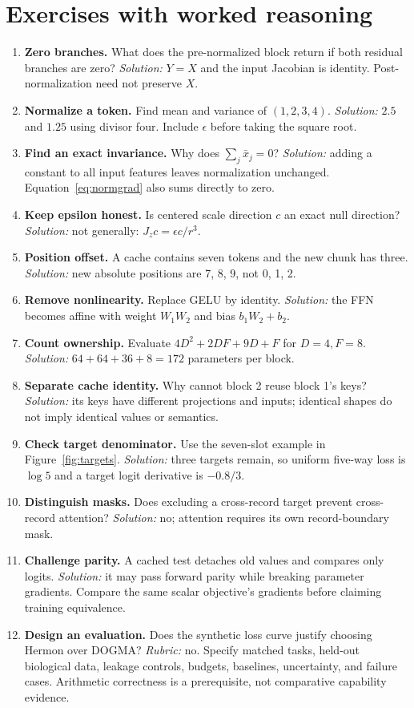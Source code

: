 \section{Exercises with worked reasoning}
\begin{enumerate}
\item \textbf{Zero branches.} What does the pre-normalized block return if both residual branches are zero? \emph{Solution:} $Y=X$ and the input Jacobian is identity. Post-normalization need not preserve $X$.
\item \textbf{Normalize a token.} Find mean and variance of $(1,2,3,4)$. \emph{Solution:} $2.5$ and $1.25$ using divisor four. Include $\epsilon$ before taking the square root.
\item \textbf{Find an exact invariance.} Why does $\sum_j\bar x_j=0$? \emph{Solution:} adding a constant to all input features leaves normalization unchanged. Equation~\ref{eq:normgrad} also sums directly to zero.
\item \textbf{Keep epsilon honest.} Is centered scale direction $c$ an exact null direction? \emph{Solution:} not generally: $J_zc=\epsilon c/r^3$.
\item \textbf{Position offset.} A cache contains seven tokens and the new chunk has three. \emph{Solution:} new absolute positions are 7, 8, 9, not 0, 1, 2.
\item \textbf{Remove nonlinearity.} Replace GELU by identity. \emph{Solution:} the FFN becomes affine with weight $W_1W_2$ and bias $b_1W_2+b_2$.
\item \textbf{Count ownership.} Evaluate $4D^2+2DF+9D+F$ for $D=4,F=8$. \emph{Solution:} $64+64+36+8=172$ parameters per block.
\item \textbf{Separate cache identity.} Why cannot block 2 reuse block 1's keys? \emph{Solution:} its keys have different projections and inputs; identical shapes do not imply identical values or semantics.
\item \textbf{Check target denominator.} Use the seven-slot example in Figure~\ref{fig:targets}. \emph{Solution:} three targets remain, so uniform five-way loss is $\log5$ and a target logit derivative is $-0.8/3$.
\item \textbf{Distinguish masks.} Does excluding a cross-record target prevent cross-record attention? \emph{Solution:} no; attention requires its own record-boundary mask.
\item \textbf{Challenge parity.} A cached test detaches old values and compares only logits. \emph{Solution:} it may pass forward parity while breaking parameter gradients. Compare the same scalar objective's gradients before claiming training equivalence.
\item \textbf{Design an evaluation.} Does the synthetic loss curve justify choosing Hermon over DOGMA? \emph{Rubric:} no. Specify matched tasks, held-out biological data, leakage controls, budgets, baselines, uncertainty, and failure cases. Arithmetic correctness is a prerequisite, not comparative capability evidence.
\end{enumerate}
